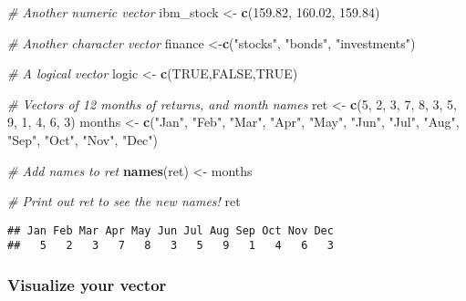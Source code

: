 \documentclass[]{article}
\newenvironment{Shaded}{\begin{snugshade}}{\end{snugshade}}
\newcommand{\KeywordTok}[1]{\textcolor[rgb]{0.13,0.29,0.53}{\textbf{#1}}}
\newcommand{\DecValTok}[1]{\textcolor[rgb]{0.00,0.00,0.81}{#1}}
\newcommand{\FloatTok}[1]{\textcolor[rgb]{0.00,0.00,0.81}{#1}}
\newcommand{\StringTok}[1]{\textcolor[rgb]{0.31,0.60,0.02}{#1}}
\newcommand{\CommentTok}[1]{\textcolor[rgb]{0.56,0.35,0.01}{\textit{#1}}}
\newcommand{\OtherTok}[1]{\textcolor[rgb]{0.56,0.35,0.01}{#1}}
\newcommand{\NormalTok}[1]{#1}
\begin{document}
\begin{Shaded}
\begin{Highlighting}[]
\CommentTok{# Another numeric vector}
\NormalTok{ibm_stock <-}\StringTok{ }\KeywordTok{c}\NormalTok{(}\FloatTok{159.82}\NormalTok{, }\FloatTok{160.02}\NormalTok{, }\FloatTok{159.84}\NormalTok{)}

\CommentTok{# Another character vector}
\NormalTok{finance <-}\KeywordTok{c}\NormalTok{(}\StringTok{"stocks"}\NormalTok{, }\StringTok{"bonds"}\NormalTok{, }\StringTok{"investments"}\NormalTok{)}

\CommentTok{# A logical vector}
\NormalTok{logic <-}\StringTok{ }\KeywordTok{c}\NormalTok{(}\OtherTok{TRUE}\NormalTok{,}\OtherTok{FALSE}\NormalTok{,}\OtherTok{TRUE}\NormalTok{)}


\CommentTok{# Vectors of 12 months of returns, and month names}
\NormalTok{ret <-}\StringTok{ }\KeywordTok{c}\NormalTok{(}\DecValTok{5}\NormalTok{, }\DecValTok{2}\NormalTok{, }\DecValTok{3}\NormalTok{, }\DecValTok{7}\NormalTok{, }\DecValTok{8}\NormalTok{, }\DecValTok{3}\NormalTok{, }\DecValTok{5}\NormalTok{, }\DecValTok{9}\NormalTok{, }\DecValTok{1}\NormalTok{, }\DecValTok{4}\NormalTok{, }\DecValTok{6}\NormalTok{, }\DecValTok{3}\NormalTok{)}
\NormalTok{months <-}\StringTok{ }\KeywordTok{c}\NormalTok{(}\StringTok{"Jan"}\NormalTok{, }\StringTok{"Feb"}\NormalTok{, }\StringTok{"Mar"}\NormalTok{, }\StringTok{"Apr"}\NormalTok{, }\StringTok{"May"}\NormalTok{, }\StringTok{"Jun"}\NormalTok{, }\StringTok{"Jul"}\NormalTok{, }\StringTok{"Aug"}\NormalTok{, }\StringTok{"Sep"}\NormalTok{, }\StringTok{"Oct"}\NormalTok{, }\StringTok{"Nov"}\NormalTok{, }\StringTok{"Dec"}\NormalTok{)}

\CommentTok{# Add names to ret}
\KeywordTok{names}\NormalTok{(ret) <-}\StringTok{ }\NormalTok{months}

\CommentTok{# Print out ret to see the new names!}
\NormalTok{ret}
\end{Highlighting}
\end{Shaded}

\begin{verbatim}
## Jan Feb Mar Apr May Jun Jul Aug Sep Oct Nov Dec 
##   5   2   3   7   8   3   5   9   1   4   6   3
\end{verbatim}

\subsubsection{Visualize your vector}\label{visualize-your-vector}
\end{document}
